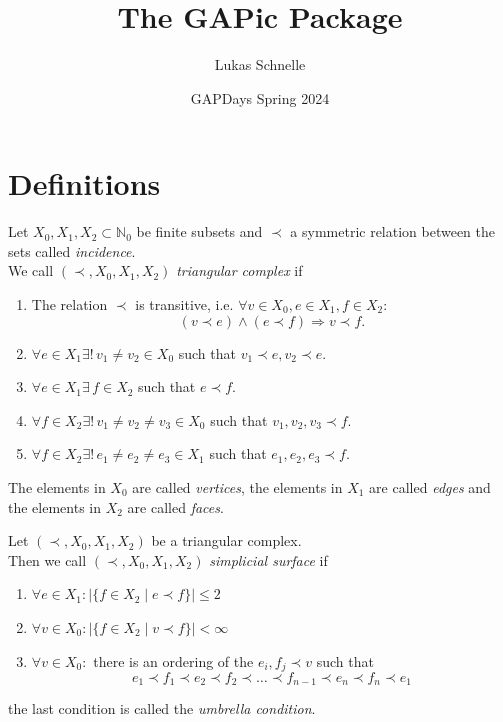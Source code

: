 \documentclass{beamer}
\title{The GAPic Package}
\subtitle{}
\author{Lukas Schnelle}
\date{GAPDays Spring 2024}
\numberwithin{equation}{aufgabe}
\newcommand\N{\mathbb N}
\begin{document}
\frame[plain]{\titlepage}

\section{Definitions}
\begin{frame}
    \begin{definition}\label{def:triangular-comp}
    	Let $X_0, X_1, X_2 \subset \N_0$ be finite subsets and \pause $\prec$ a symmetric relation between the sets called \emph{incidence}. \pause \\
    	We call $(\prec, X_0, X_1, X_2)$ \emph{triangular complex} if
    	\begin{enumerate}[label=(\roman*)] \pause 
    		\item The relation $\prec$ is transitive, i.e. $\forall v \in X_0, e \in X_1, f \in X_2$:
    		$$(v \prec e) \wedge (e \prec f) \Rightarrow v \prec f.$$
    		\item \pause $\forall e \in X_1 \exists !\,  v_1 \neq v_2 \in X_0$ such that $v_1 \prec e, v_2 \prec e$.\pause 
    		\item $\forall e \in X_1 \exists \, f \in X_2$ such that $e \prec f$. \pause 
    		\item $\forall f \in X_2 \exists ! \, v_1 \neq v_2 \neq v_3 \in X_0$ such that $v_1, v_2, v_3 \prec f$. \pause 
            \item $\forall f \in X_2 \exists ! \, e_1 \neq e_2 \neq e_3 \in X_1$ such that $e_1, e_2, e_3 \prec f$. \pause 
    	\end{enumerate}
    	The elements in $X_0$ are called \emph{vertices}, the elements in $X_1$ are called \emph{edges} and the elements in $X_2$ are called \emph{faces}.
    \end{definition}
\end{frame}

\begin{frame}
    \begin{definition}
        Let $(\prec, X_0, X_1, X_2)$ be a triangular complex.\\
        Then we call $(\prec, X_0, X_1, X_2)$ \emph{simplicial surface} if 
        \begin{enumerate}[label=(\roman*)]
            \item $\forall e \in X_1 : | \{ f \in X_2 \mid e \prec f \} | \leq 2 $
            \item $\forall v \in X_0 : | \{ f \in X_2 \mid v \prec f \} | < \infty$
            \item $\forall v \in X_0: $ there is an ordering of the $e_i, f_j \prec v$ such that 
            $$
                e_1 \prec f_1 \prec e_2 \prec f_2 \prec \dots \prec f_{n-1} \prec e_{n} \prec f_{n} \prec e_1
            $$
        \end{enumerate}
        the last condition is called the \emph{umbrella condition}.
    \end{definition}
\end{frame}
\end{document}
